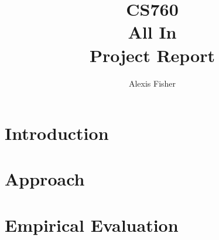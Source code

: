 \documentclass[]{article}
\title{CS760 \\ All In \\ Project Report }
\author{  Alexis Fisher }
\begin{document}
\ifpdf
{}
\else
{}
\fi

\maketitle


\section{Introduction}

\section{Approach}


\section{Empirical Evaluation}
\end{document}

